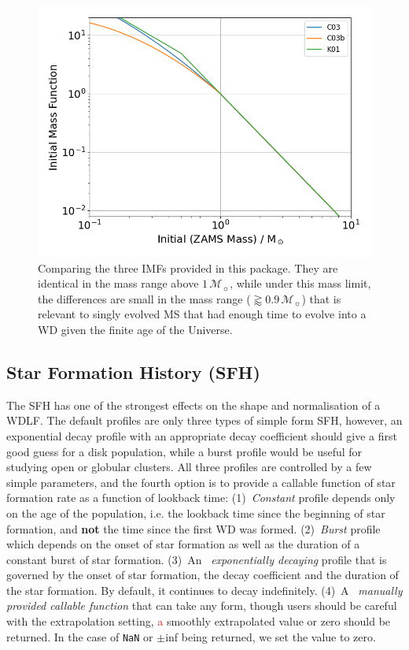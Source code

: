 \documentclass[fleqn,usenatbib]{rasti}
\newcommand{\msun}{\mathcal{M}_{\sun}}
\begin{document}
\begin{figure}
    \centering
    \includegraphics[width=\columnwidth]{fig_04_imfs.png}
    \caption{Comparing the three IMFs provided in this package. They are
    identical in the mass range above $1\,\msun$, while under this mass
    limit, the differences are small in the mass range ($\gtrapprox0.9\,\msun$)
    that is relevant to singly evolved MS that had enough time to evolve into a
    WD given the finite age of the Universe.}
    \label{fig:imfs}
\end{figure}

\subsection{Star Formation History (SFH)}
The SFH has one of the strongest effects on the shape and normalisation of a
WDLF. The default profiles are only three types of simple form SFH, however,
an exponential decay profile with an appropriate decay coefficient should give a
first good guess for a disk population, while a burst profile would be useful
for studying open or globular clusters. All three profiles are controlled by
a few simple parameters, and the fourth option is to provide a callable
function of star formation rate as a function of lookback time:
(1)~\textit{Constant} profile depends only on the age of the population,
i.e. the lookback time since the beginning of star formation,
and \textbf{not} the time since the first WD was formed. (2)~\textit{Burst}
profile which depends on the onset of star formation as well as the duration
of a constant burst of star formation. (3)~An ~\textit{exponentially decaying}
profile that is governed by the onset of star formation, the decay coefficient
and the duration of the star formation. By default, it continues to decay
indefinitely. (4)~A ~\textit{manually provided callable function} that can take
any form, though users should be careful with the extrapolation setting,
\textcolor{red}{a} smoothly extrapolated value or zero should be returned. In
the case of \verb+NaN+ or $\pm$inf being returned, we set the value to zero.
\end{document}
